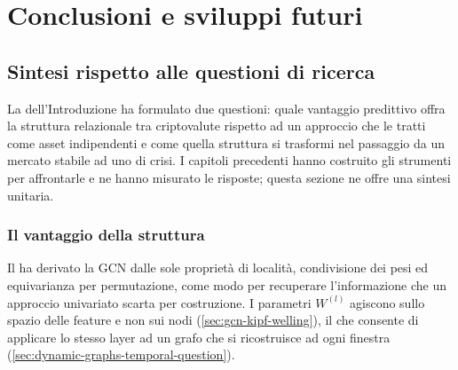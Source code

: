 \chapter{Conclusioni e sviluppi futuri}
\label{ch:conclusions}

\section{Sintesi rispetto alle questioni di ricerca}
\label{sec:summary-research-questions}

La  dell'Introduzione ha formulato due questioni: quale vantaggio predittivo offra la struttura relazionale tra criptovalute rispetto ad un approccio che le tratti come asset indipendenti e come quella struttura si trasformi nel passaggio da un mercato stabile ad uno di crisi. I capitoli precedenti hanno costruito gli strumenti per affrontarle e ne hanno misurato le risposte; questa sezione ne offre una sintesi unitaria.

\subsection{Il vantaggio della struttura}

Il  ha derivato la GCN dalle sole proprietà di località, condivisione dei pesi ed equivarianza per permutazione, come modo per recuperare l'informazione che un approccio univariato scarta per costruzione. I parametri $W^{(l)}$ agiscono sullo spazio delle feature e non sui nodi (\cref{sec:gcn-kipf-welling}), il che consente di applicare lo stesso layer ad un grafo che si ricostruisce ad ogni finestra (\cref{sec:dynamic-graphs-temporal-question}).

